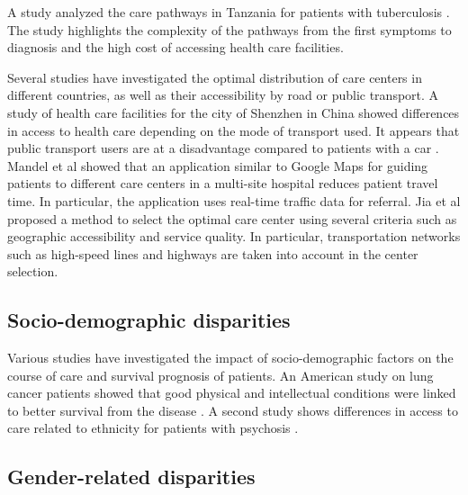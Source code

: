 A study analyzed the care pathways in Tanzania for patients with tuberculosis \cite{mhalu_pathways_2019}. The study highlights the complexity of the pathways from the first symptoms to diagnosis and the high cost of accessing health care facilities.

Several studies have investigated the optimal distribution of care centers in different countries, as well as their accessibility by road or public transport. A study of health care facilities for the city of Shenzhen in China showed differences in access to health care depending on the mode of transport used. It appears that public transport users are at a disadvantage compared to patients with a car \cite{tao_spatial_2018}. Mandel et al \cite{mandel_optimizing_2018} showed that an application similar to Google Maps for guiding patients to different care centers in a multi-site hospital reduces patient travel time. In particular, the application uses real-time traffic data for referral. Jia et al \cite{jia_selecting_2014} proposed a method to select the optimal care center using several criteria such as geographic accessibility and service quality. In particular, transportation networks such as high-speed lines and highways are taken into account in the center selection.

\subsection*{Socio-demographic disparities}

Various studies have investigated the impact of socio-demographic factors on the course of care and survival prognosis of patients. An American study on lung cancer patients showed that good physical and intellectual conditions were linked to better survival from the disease \cite{pierzynski_socio-demographic_2018}. A second study shows differences in access to care related to ethnicity for patients with psychosis \cite{anderson_meta-analysis_2014}.

\subsection*{Gender-related disparities}

